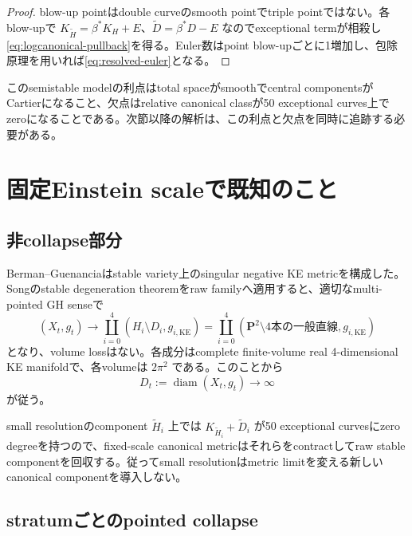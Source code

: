 \documentclass[11pt,a4paper]{ltjsarticle}
\theoremstyle{definition}
\theoremstyle{remark}
\newcommand{\PP}{\mathbf P}
\newcommand{\diam}{\operatorname{diam}}
\begin{document}
\begin{proof}
blow-up pointはdouble curveのsmooth pointでtriple pointではない。各blow-upで
$K_{\widetilde H}=\beta^*K_H+E$、$\widetilde D=\beta^*D-E$ なのでexceptional termが相殺し\eqref{eq:logcanonical-pullback}を得る。Euler数はpoint blow-upごとに1増加し、包除原理を用いれば\eqref{eq:resolved-euler}となる。
\end{proof}

このsemistable modelの利点はtotal spaceがsmoothでcentral componentsがCartierになること、欠点はrelative canonical classが50 exceptional curves上でzeroになることである。次節以降の解析は、この利点と欠点を同時に追跡する必要がある。

\section{固定Einstein scaleで既知のこと}

\subsection{非collapse部分}

Berman--Guenanciaはstable variety上のsingular negative KE metricを構成した\cite{BermanGuenancia}。Songのstable degeneration theorem\cite{Song}をraw familyへ適用すると、適切なmulti-pointed GH senseで
\begin{equation}\label{eq:songlimit}
 (X_t,g_t)\longrightarrow
 \coprod_{i=0}^4
 \left(H_i\setminus D_i,g_{i,\mathrm{KE}}\right)
 =\coprod_{i=0}^4
 \left(\PP^2\setminus4\text{本の一般直線},g_{i,\mathrm{KE}}\right)
\end{equation}
となり、volume lossはない。各成分はcomplete finite-volume real 4-dimensional KE manifoldで、各volumeは $2\pi^2$ である。このことから
\begin{equation}\label{eq:diamdiverge}
 D_t:=\diam(X_t,g_t)\longrightarrow\infty
\end{equation}
が従う。

small resolutionのcomponent $\widetilde H_i$ 上では $K_{\widetilde H_i}+\widetilde D_i$ が50 exceptional curvesにzero degreeを持つので、fixed-scale canonical metricはそれらをcontractしてraw stable componentを回収する。従ってsmall resolutionはmetric limitを変える新しいcanonical componentを導入しない。

\subsection{stratumごとのpointed collapse}
\end{document}
